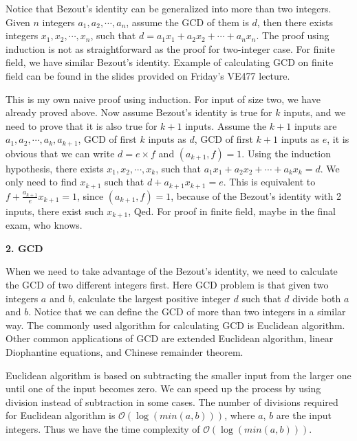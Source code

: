 \documentclass[catalog.tex]{subfiles}
\begin{document}
Notice that Bezout's identity can be generalized into more than two integers. Given $n$ integers $a_1,a_2,\cdots, a_n$, assume the GCD of them is $d$, then there exists integers $x_1, x_2,\cdots, x_n$, such that $d = a_1x_1 + a_2x_2 + \cdots + a_nx_n$. The proof using induction is not as straightforward as the proof for two-integer case. For finite field, we have similar Bezout's identity. Example of calculating GCD on finite field can be found in the slides provided on Friday's VE477 lecture\cite{ve477}. \newline

This is my own naive proof using induction. For input of size two, we have already proved above. Now assume Bezout's identity is true for $k$ inputs, and we need to prove that it is also true for $k + 1$ inputs. Assume the $k+1$ inputs are $a_1, a_2, \cdots, a_k, a_{k+1}$, GCD of first $k$ inputs as $d$, GCD of first $k+1$ inputs as $e$, it is obvious that we can write $d = e\times f$ and $(a_{k+1}, f) = 1$. Using the induction hypothesis, there exists $x_1, x_2, \cdots, x_k$, such that $a_1x_1+a_2x_2+\cdots+a_kx_k = d$. We only need to find $x_{k+1}$ such that $d + a_{k+1}x_{k+1} = e$. This is equivalent to $f + \frac{a_{k+1}}{e} x_{k+1} = 1$, since $(a_{k+1}, f) = 1$, because of the Bezout's identity with 2 inputs, there exist such $x_{k+1}$, Qed. For proof in finite field, maybe in the final exam, who knows.\newline

\textbf{2. GCD}\newline

When we need to take advantage of the Bezout's identity, we need to calculate the GCD of two different integers first. Here GCD problem is that given two integers $a$ and $b$, calculate the largest positive integer $d$ such that $d$ divide both $a$ and $b$. Notice that we can define the GCD of more than two integers in a similar way. The commonly used algorithm for calculating GCD is Euclidean algorithm. Other common applications of GCD are extended Euclidean algorithm, 	linear Diophantine equations, and Chinese remainder theorem. \newline

Euclidean algorithm is based on subtracting the smaller input from the larger one until one of the input becomes zero. We can speed up the process by using division instead of subtraction in some cases. The number of divisions required for Euclidean algorithm is $\mathcal{O}(\log (min(a,b)))$, where $a$, $b$ are the input integers\cite{grossman1924discussions}. Thus we have the time complexity of $\mathcal{O}(\log (min(a,b)))$. \newline
\end{document}
